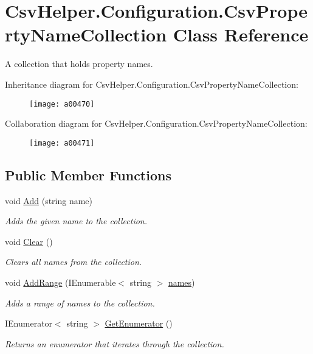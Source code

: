 \hypertarget{a00071}{\section{Csv\-Helper.\-Configuration.\-Csv\-Property\-Name\-Collection Class Reference}
\label{a00071}
}


A collection that holds property names.  




Inheritance diagram for Csv\-Helper.\-Configuration.\-Csv\-Property\-Name\-Collection\-:
\nopagebreak
\begin{figure}[H]
\begin{center}
\leavevmode
\texttt{[image: a00470]}
\end{center}
\end{figure}


Collaboration diagram for Csv\-Helper.\-Configuration.\-Csv\-Property\-Name\-Collection\-:
\nopagebreak
\begin{figure}[H]
\begin{center}
\leavevmode
\texttt{[image: a00471]}
\end{center}
\end{figure}
\subsection*{Public Member Functions}
\begin{DoxyCompactItemize}
\item 
void \hyperlink{a00071_ad7b7d11d5814bcce5ed38e054ef71b4e}{Add} (string name)
\begin{DoxyCompactList}\small\item\em Adds the given name to the collection. \end{DoxyCompactList}\item 
void \hyperlink{a00071_abec990435c8dccfb4553602b89f93201}{Clear} ()
\begin{DoxyCompactList}\small\item\em Clears all names from the collection. \end{DoxyCompactList}\item 
void \hyperlink{a00071_ac568746273968080890abca50b882802}{Add\-Range} (I\-Enumerable$<$ string $>$ \hyperlink{a00071_a41eb6804d8afe8d674e64d71f66962ce}{names})
\begin{DoxyCompactList}\small\item\em Adds a range of names to the collection. \end{DoxyCompactList}\item 
I\-Enumerator$<$ string $>$ \hyperlink{a00071_a61b6a80e51d06f17d0043ec6aef89f1b}{Get\-Enumerator} ()
\begin{DoxyCompactList}\small\item\em Returns an enumerator that iterates through the collection. \end{DoxyCompactList}\end{DoxyCompactItemize}
